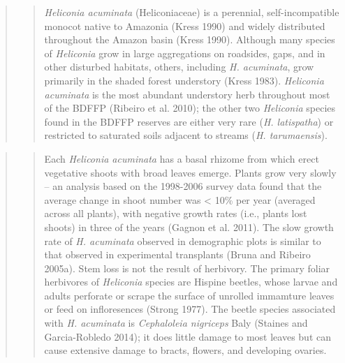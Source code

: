 \documentclass[
  man, donotrepeattitle,floatsintext]{apa6}
\begin{document}
\begin{quote}
\begin{quote}
\emph{Heliconia acuminata} (Heliconiaceae) is a perennial, self-incompatible monocot native to Amazonia (Kress 1990) and widely distributed throughout the Amazon basin (Kress 1990). Although many species of \emph{Heliconia} grow in large aggregations on roadsides, gaps, and in other disturbed habitats, others, including \emph{H. acuminata}, grow primarily in the shaded forest understory (Kress 1983). \emph{Heliconia acuminata} is the most abundant understory herb throughout most of the BDFFP (Ribeiro et al. 2010); the other two \emph{Heliconia} species found in the BDFFP reserves are either very rare (\emph{H. latispatha}) or restricted to saturated soils adjacent to streams (\emph{H. tarumaensis}).
\end{quote}
\end{quote}

\begin{quote}
\begin{quote}
Each \emph{Heliconia acuminata} has a basal rhizome from which erect vegetative shoots with broad leaves emerge. Plants grow very slowly -- an analysis based on the 1998-2006 survey data found that the average change in shoot number was \textless{} 10\% per year (averaged across all plants), with negative growth rates (i.e., plants lost shoots) in three of the years (Gagnon et al. 2011). The slow growth rate of \emph{H. acuminata} observed in demographic plots is similar to that observed in experimental transplants (Bruna and Ribeiro 2005a). Stem loss is not the result of herbivory. The primary foliar herbivores of \emph{Heliconia} species are Hispine beetles, whose larvae and adults perforate or scrape the surface of unrolled immamture leaves or feed on infloresences (Strong 1977). The beetle species associated with \emph{H. acuminata} is \emph{Cephaloleia nigriceps} Baly (Staines and Garcia-Robledo 2014); it does little damage to most leaves but can cause extensive damage to bracts, flowers, and developing ovaries.
\end{quote}
\end{quote}
\end{document}
